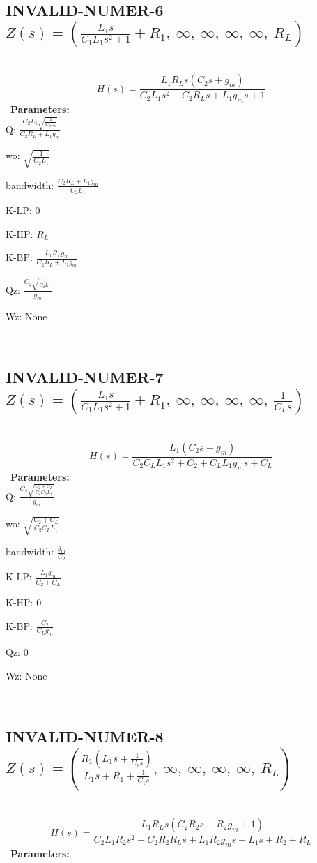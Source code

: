 \documentclass{article}
\begin{document}
\ 

\subsection{INVALID-NUMER-6 $Z(s) = \left( \frac{L_{1} s}{C_{1} L_{1} s^{2} + 1} + R_{1}, \  \infty, \  \infty, \  \infty, \  \infty, \  R_{L}\right)$ } \ 
\textbf{\[H(s) = \frac{L_{1} R_{L} s \left(C_{2} s + g_{m}\right)}{C_{2} L_{1} s^{2} + C_{2} R_{L} s + L_{1} g_{m} s + 1}\] } \ 
\textbf{Parameters:}\\ 

Q: $\frac{C_{2} L_{1} \sqrt{\frac{1}{C_{2} L_{1}}}}{C_{2} R_{L} + L_{1} g_{m}}$\ 

wo: $\sqrt{\frac{1}{C_{2} L_{1}}}$\ 

bandwidth: $\frac{C_{2} R_{L} + L_{1} g_{m}}{C_{2} L_{1}}$\ 

K-LP: $0$\ 

K-HP: $R_{L}$\ 

K-BP: $\frac{L_{1} R_{L} g_{m}}{C_{2} R_{L} + L_{1} g_{m}}$\ 

Qz: $\frac{C_{2} \sqrt{\frac{1}{C_{2} L_{1}}}}{g_{m}}$\ 

Wz: $\text{None}$\ 

\ 

\subsection{INVALID-NUMER-7 $Z(s) = \left( \frac{L_{1} s}{C_{1} L_{1} s^{2} + 1} + R_{1}, \  \infty, \  \infty, \  \infty, \  \infty, \  \frac{1}{C_{L} s}\right)$ } \ 
\textbf{\[H(s) = \frac{L_{1} \left(C_{2} s + g_{m}\right)}{C_{2} C_{L} L_{1} s^{2} + C_{2} + C_{L} L_{1} g_{m} s + C_{L}}\] } \ 
\textbf{Parameters:}\\ 

Q: $\frac{C_{2} \sqrt{\frac{C_{2} + C_{L}}{C_{2} C_{L} L_{1}}}}{g_{m}}$\ 

wo: $\sqrt{\frac{C_{2} + C_{L}}{C_{2} C_{L} L_{1}}}$\ 

bandwidth: $\frac{g_{m}}{C_{2}}$\ 

K-LP: $\frac{L_{1} g_{m}}{C_{2} + C_{L}}$\ 

K-HP: $0$\ 

K-BP: $\frac{C_{2}}{C_{L} g_{m}}$\ 

Qz: $0$\ 

Wz: $\text{None}$\ 

\ 

\subsection{INVALID-NUMER-8 $Z(s) = \left( \frac{R_{1} \left(L_{1} s + \frac{1}{C_{1} s}\right)}{L_{1} s + R_{1} + \frac{1}{C_{1} s}}, \  \infty, \  \infty, \  \infty, \  \infty, \  R_{L}\right)$ } \ 
\textbf{\[H(s) = \frac{L_{1} R_{L} s \left(C_{2} R_{2} s + R_{2} g_{m} + 1\right)}{C_{2} L_{1} R_{2} s^{2} + C_{2} R_{2} R_{L} s + L_{1} R_{2} g_{m} s + L_{1} s + R_{2} + R_{L}}\] } \ 
\textbf{Parameters:}\\ 
\end{document}
